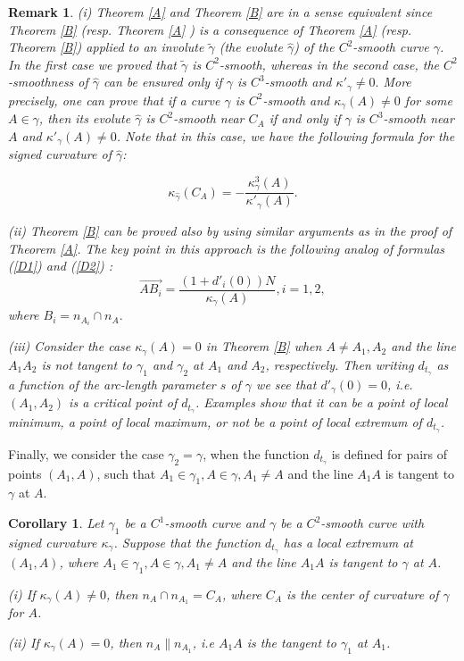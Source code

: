 \documentclass[a4paper,12pt]{amsart}
\newtheorem{cor}[thm]{Corollary}
\newtheorem{rem}[thm]{Remark}
\def\g{\gamma}
\begin{document}
\begin{rem}\label{rem2}
(i) Theorem \ref{A} and  Theorem \ref{B} are in a sense equivalent
since Theorem \ref{B} (resp. Theorem \ref{A} ) is a consequence of
Theorem \ref{A} (resp. Theorem \ref{B}) applied to an involute
$\widetilde{\g}$ (the evolute $\widehat{\g}$) of the $C^2$-smooth
curve $\g$. In the first case we proved that $\widetilde{\g}$ is
$C^2$-smooth, whereas in the second case, the $C^2$-smoothness of
$\widehat{\g}$ can be ensured only if $\g$ is $C^3$-smooth and
$\kappa'_{\g}\neq 0.$ More precisely, one can prove that if a
curve $\g$ is $C^2$-smooth and $\kappa_{\g}(A)\neq 0$ for some
$A\in \g$, then its evolute $\widehat{\g}$ is $C^2$-smooth near
$C_A$ if and only if $\g$ is $C^3$-smooth near $A$ and
$\kappa'_{\g}(A)\neq 0$. Note that in this case, we have the
following formula for the signed curvature of
$\widehat{\g}$:

\begin{equation}\label{15}
\kappa_{\widehat{\g}}(C_A)=-\frac{\kappa^3_{\g}(A)}{\kappa'_{\g}(A)}.
\end{equation}


(ii) Theorem \ref{B} can be proved also by using similar arguments
as in the proof of Theorem \ref{A}. The key point in this approach
is the following analog of formulas (\ref{D1}) and (\ref{D2}) :
$$\overrightarrow{AB_i}= \frac{(1+d'_i(0))N}{\kappa_{\g}(A)}, i=1,2,$$
where $B_i=n_{A_i}\cap n_A.$
\


(iii) Consider the case $\kappa_{\g}(A)=0$ in Theorem \ref{B} when
$A\neq A_1,A_2$ and the line $A_1A_2$ is not tangent to $\g_1$ and
$\g_2$ at $A_1$ and $A_2$, respectively. Then writing $d_{t_{\g}}$
as a function of the arc-length parameter $s$ of $\g$ we see that
$d'_{\g}(0)=0$, i.e. $(A_1,A_2)$ is a critical point of
$d_{t_\g}$. Examples show that it can be a point of local minimum,
a point of local maximum, or not be a point of local extremum of
$d_{t_{\g}}$.
\end{rem}
\smallskip

Finally,  we consider the case $\g_2=\g$, when the function
$d_{t_{\g}}$ is defined for pairs of points $(A_1,A)$, such that
$A_1\in \g_1, A\in \g , A_1\neq A$ and the line $A_1A$ is tangent
to $\g$ at $A$.

\begin{cor}\label{cor4} Let $\g_1$ be a $C^1$-smooth curve and $\g$ be a
$C^2$-smooth curve with signed curvature $\kappa_{\g}$. Suppose
that the function $d_{t_{\g}}$ has a local extremum at $(A_1,A)$,
where $A_1\in \g_1, A\in \g , A_1\neq A$ and the line $A_1A$ is
tangent to $\g$ at $A$.

(i)  If $\kappa_{\g}(A)\neq 0$, then $n_A \cap n_{A_1}=C_A$,
where $C_A$ is the  center of curvature of $\g$ for $A$.

(ii) If $\kappa_{\g}(A)=0$, then $n_A\parallel n_{A_1}$, i.e
$A_1A$ is the tangent to $\g_1$ at $A_1$.
\end{cor}
\end{document}
